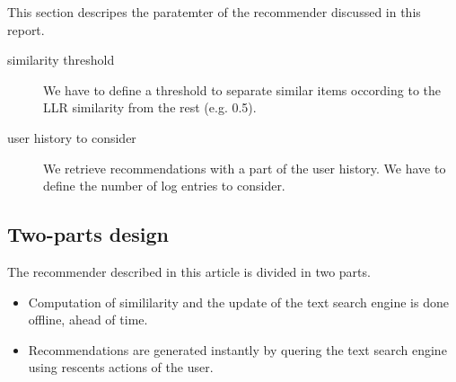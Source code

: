 This section descripes the paratemter of the recommender discussed in this report.
\begin{description}
\item[similarity threshold] We have to define a threshold to separate similar items occording to the LLR similarity from the rest (e.g. 0.5).
\item[user history to consider] We retrieve recommendations with a part of the user history. We have to define the number of log entries to consider.
\end{description}

\subsection{Two-parts design}

The recommender described in this article is divided in two parts.
\begin{itemize}
\item Computation of simililarity and the update of the text search engine is done offline, ahead of time.
\item Recommendations are generated instantly by quering the text search engine using rescents actions of the user.
\end{itemize}
